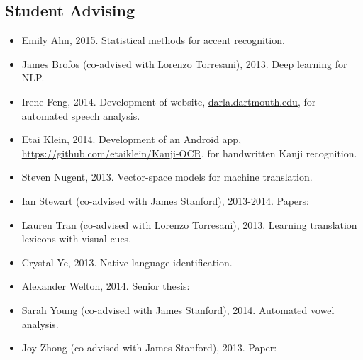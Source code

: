 \documentclass[10.5pt,letterpaper]{article}
\begin{document}
\subsection*{Student Advising}

\begin{itemize}
\item Emily Ahn, 2015. Statistical methods for accent recognition.
\item James Brofos (co-advised with Lorenzo Torresani), 2013. Deep learning for NLP.
\item Irene Feng, 2014. Development of website, \url{darla.dartmouth.edu}, for automated speech analysis.
\item Etai Klein, 2014. Development of an Android app, \url{https://github.com/etaiklein/Kanji-OCR}, for handwritten Kanji recognition.
\item Steven Nugent, 2013. Vector-space models for machine translation.
\item Ian Stewart (co-advised with James Stanford), 2013-2014. Papers:


\item Lauren Tran (co-advised with Lorenzo Torresani), 2013. Learning translation lexicons with visual cues.

\item Crystal Ye, 2013. Native language identification.
\item Alexander Welton, 2014. Senior thesis:


\item Sarah Young (co-advised with James Stanford), 2014. Automated vowel analysis.
\item Joy Zhong (co-advised with James Stanford), 2013. Paper:

\end{itemize}
\end{document}
